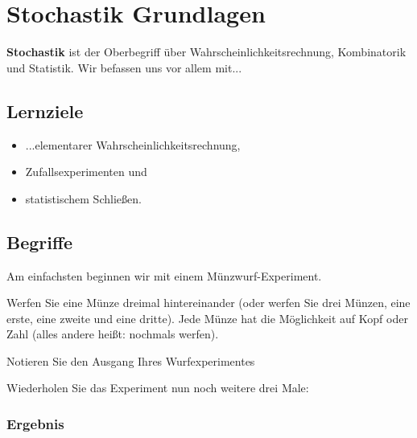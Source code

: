 
\section{Stochastik Grundlagen}


\textbf{Stochastik} ist der Oberbegriff über
Wahrscheinlichkeitsrechnung, Kombinatorik und Statistik. Wir befassen
uns vor allem mit...

\subsection*{Lernziele}
\begin{itemize}
	\item ...elementarer Wahrscheinlichkeitsrechnung,
	\item Zufallsexperimenten und
	\item{statistischem Schließen.}
\end{itemize}


\subsection{Begriffe}
Am einfachsten beginnen wir mit einem Münzwurf-Experiment.

Werfen Sie eine Münze dreimal hintereinander (oder werfen Sie drei
Münzen, eine erste, eine zweite und eine dritte). Jede Münze hat die
Möglichkeit auf Kopf oder Zahl (alles andere heißt: nochmals werfen).

Notieren Sie den Ausgang Ihres Wurfexperimentes


\TRAINER{\vspace{24mm}}

Wiederholen Sie das Experiment nun noch weitere drei Male:



\newpage



\subsubsection{Ergebnis}

